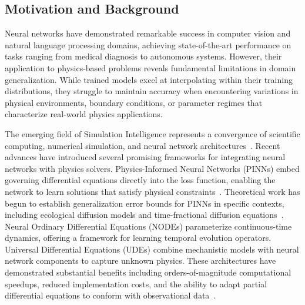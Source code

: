 \subsection{Motivation and Background}

Neural networks have demonstrated remarkable success in computer vision and natural language processing domains, achieving state-of-the-art performance on tasks ranging from medical diagnosis to autonomous systems. However, their application to physics-based problems reveals fundamental limitations in domain generalization. While trained models excel at interpolating within their training distributions, they struggle to maintain accuracy when encountering variations in physical environments, boundary conditions, or parameter regimes that characterize real-world physics applications.

The emerging field of Simulation Intelligence represents a convergence of scientific computing, numerical simulation, and neural network architectures~\cite{Paszke2019PyTorch,Ott2020A,Prashanthi2025Deep}. Recent advances have introduced several promising frameworks for integrating neural networks with physics solvers. Physics-Informed Neural Networks (PINNs) embed governing differential equations directly into the loss function, enabling the network to learn solutions that satisfy physical constraints~\cite{Mishra2020Estimate,Ryck2024Numerica}. Theoretical work has begun to establish generalization error bounds for PINNs in specific contexts, including ecological diffusion models and time-fractional diffusion equations~\cite{Reyes2025A,Trinh2025Converge}. Neural Ordinary Differential Equations (NODEs) parameterize continuous-time dynamics, offering a framework for learning temporal evolution operators. Universal Differential Equations (UDEs) combine mechanistic models with neural network components to capture unknown physics. These architectures have demonstrated substantial benefits including orders-of-magnitude computational speedups, reduced implementation costs, and the ability to adapt partial differential equations to conform with observational data~\cite{Ren2022Towards,Wong2025Evolutio}.

